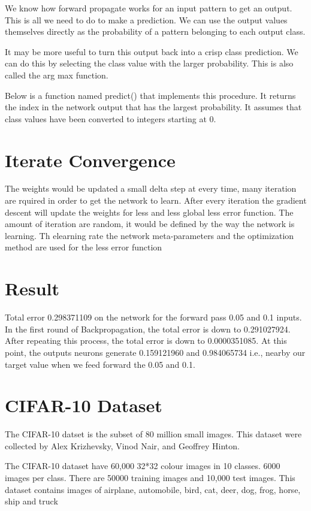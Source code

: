 \documentclass[12pt]{article}
\begin{document}
We know how forward propagate works for an input pattern to get an output. This is all we need to do to make a prediction. We can use the output values themselves directly as the probability of a pattern belonging to each output class.

It may be more useful to turn this output back into a crisp class prediction. We can do this by selecting the class value with the larger probability. This is also called the arg max function.

Below is a function named predict() that implements this procedure. It returns the index in the network output that has the largest probability. It assumes that class values have been converted to integers starting at 0.

\section{Iterate Convergence}

The weights would be updated a small delta step at every time, many iteration are rquired in order to get the network to learn. After every iteration the gradient descent will update the weights for less and less global less error function. The amount of iteration are random, it would be defined by the way the network is learning. Th elearning rate the network meta-parameters and the optimization method are used for the less error function

\section{Result}

 Total error 0.298371109 on the network for the forward pass 0.05 and 0.1 inputs. In the first round of Backpropagation, the total error is down to 0.291027924. After repeating this process, the total error is down to 0.0000351085. At this point, the outputs neurons generate 0.159121960 and 0.984065734 i.e., nearby our target value when we feed forward the 0.05 and 0.1.

\section{CIFAR-10 Dataset}
 The CIFAR-10 datset is the subset of 80 million small images. This dataset were collected by Alex Krizhevsky, Vinod Nair, and Geoffrey Hinton.
 
The CIFAR-10 dataset have 60,000 32*32 colour images in 10 classes. 6000 images per class. There are 50000 training images and 10,000 test images. 
This dataset contains images of airplane, automobile, bird, cat, deer, dog, frog, horse, ship and truck
\end{document}
